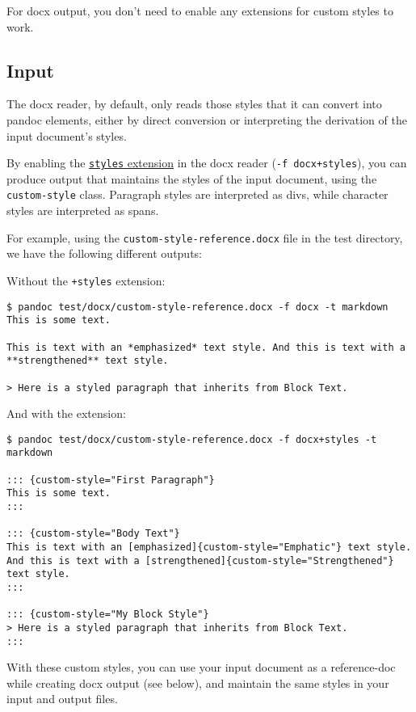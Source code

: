 \documentclass[
  a4paper,
]{article}
\begin{document}
For docx output, you don't need to enable any extensions for custom
styles to work.

\hypertarget{input}{%
\subsection{Input}\label{input}}

The docx reader, by default, only reads those styles that it can convert
into pandoc elements, either by direct conversion or interpreting the
derivation of the input document's styles.

By enabling the \protect\hyperlink{ext-styles}{\texttt{styles}
extension} in the docx reader (\texttt{-f\ docx+styles}), you can
produce output that maintains the styles of the input document, using
the \texttt{custom-style} class. Paragraph styles are interpreted as
divs, while character styles are interpreted as spans.

For example, using the \texttt{custom-style-reference.docx} file in the
test directory, we have the following different outputs:

Without the \texttt{+styles} extension:

\begin{verbatim}
$ pandoc test/docx/custom-style-reference.docx -f docx -t markdown
This is some text.

This is text with an *emphasized* text style. And this is text with a
**strengthened** text style.

> Here is a styled paragraph that inherits from Block Text.
\end{verbatim}

And with the extension:

\begin{verbatim}
$ pandoc test/docx/custom-style-reference.docx -f docx+styles -t markdown

::: {custom-style="First Paragraph"}
This is some text.
:::

::: {custom-style="Body Text"}
This is text with an [emphasized]{custom-style="Emphatic"} text style.
And this is text with a [strengthened]{custom-style="Strengthened"}
text style.
:::

::: {custom-style="My Block Style"}
> Here is a styled paragraph that inherits from Block Text.
:::
\end{verbatim}

With these custom styles, you can use your input document as a
reference-doc while creating docx output (see below), and maintain the
same styles in your input and output files.
\end{document}
